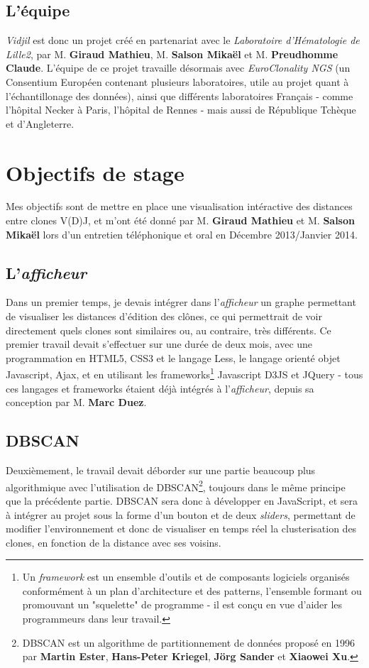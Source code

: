 \documentclass[12pt]{report}
\begin{document}
\begin{spacing}{1.2}
\subsection{L'équipe}
\textit{Vidjil} est donc un projet créé en partenariat avec le \textit{Laboratoire d'Hématologie de Lille2}, par M. \textbf{Giraud Mathieu}, M. \textbf{Salson Mikaël} et M. \textbf{Preudhomme Claude}.
\newline
L'équipe de ce projet travaille désormais avec \textit{EuroClonality NGS} (un Consentium Européen contenant plusieurs laboratoires, utile au projet quant à l'échantillonage des données), ainsi que différents laboratoires Français - comme l'hôpital Necker à Paris, l'hôpital de Rennes - mais aussi de République Tchèque et d'Angleterre.

\section{Objectifs de stage}
Mes objectifs sont de mettre en place une visualisation intéractive des distances entre clones V(D)J, et m'ont été donné par M. \textbf{Giraud Mathieu} et M. \textbf{Salson Mikaël} lors d'un entretien téléphonique et oral en Décembre 2013/Janvier 2014.

\subsection{L'\textit{afficheur}}
Dans un premier temps, je devais intégrer dans l'\textit{afficheur} un graphe permettant de visualiser les distances d'édition des clônes, ce qui permettrait de voir directement quels clones sont similaires ou, au contraire, très différents.
\newline
Ce premier travail devait s'effectuer sur une durée de deux mois, avec une programmation en HTML5, CSS3 et le langage Less, le langage orienté objet Javascript, Ajax, et en utilisant les frameworks\footnote{Un \textit{framework} est un ensemble d'outils et de composants logiciels organisés conformément à un plan d'architecture et des patterns, l'ensemble formant ou promouvant un "squelette" de programme - il est conçu en vue d'aider les programmeurs dans leur travail.} Javascript D3JS et JQuery - tous ces langages et frameworks étaient déjà intégrés à l'\textit{afficheur}, depuis sa conception par M. \textbf{Marc Duez}.
\subsection{DBSCAN}
Deuxièmement, le travail devait déborder sur une partie beaucoup plus algorithmique avec l'utilisation de DBSCAN\footnote{DBSCAN est un algorithme de partitionnement de données proposé en 1996 par \textbf{Martin Ester}, \textbf{Hans-Peter Kriegel}, \textbf{Jörg Sander} et \textbf{Xiaowei Xu}.}, toujours dans le même principe que la précédente partie.
\newline
DBSCAN sera donc à développer en JavaScript, et sera à intégrer au projet sous la forme d'un bouton et de deux \textit{sliders}, permettant de modifier l'environnement et donc de visualiser en temps réel la clusterisation des clones, en fonction de la distance avec ses voisins.


\end{spacing}
\end{document}

